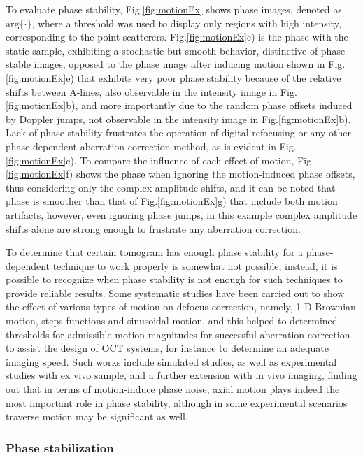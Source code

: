 To evaluate phase stability, Fig.\ref{fig:motionEx} shows phase images, denoted as $\text{arg}\{\cdot\}$, where a threshold was used to display only regions with high intensity, corresponding to the point scatterers. Fig.\ref{fig:motionEx}e) is the phase with the static sample, exhibiting a stochastic but smooth behavior, distinctive of phase stable images, opposed to the phase image after inducing motion shown in Fig.\ref{fig:motionEx}e) that exhibits very poor phase stability because of the relative shifts between A-lines, also observable in the intensity image in Fig.\ref{fig:motionEx}b), and more importantly due to the random phase offsets induced by Doppler jumps, not observable in the intensity image in Fig.\ref{fig:motionEx}b). Lack of phase stability frustrates the operation of digital refocusing or any other phase-dependent aberration correction method, as is evident in Fig.\ref{fig:motionEx}c). To compare the influence of each effect of motion, Fig.\ref{fig:motionEx}f) shows the phase when ignoring the motion-induced phase offsets, thus considering only the complex amplitude shifts, and it can be noted that phase is smoother than that of Fig.\ref{fig:motionEx}g) that include both motion artifacts, however, even ignoring phase jumps, in this example complex amplitude shifts alone are strong enough to frustrate any aberration correction.

To determine that certain tomogram has enough phase stability for a phase-dependent technique to work properly is somewhat not possible, instead, it is possible to recognize when phase stability is not enough for such techniques to provide reliable results. Some systematic studies have been carried out to show the effect of various types of motion on defocus correction, namely, 1-D Brownian motion, steps functions and sinusoidal motion, and this helped to determined thresholds for admissible motion magnitudes for successful aberration correction~\cite{Shemonski} to assist the design of OCT systems, for instance to determine an adequate imaging speed. Such works include simulated studies, as well as experimental studies with ex vivo sample, and a further extension with in vivo imaging, finding out that in terms of motion-induce phase noise, axial motion plays indeed the most important role in phase stability, although in some experimental scenarios traverse motion may be significant as well.

\subsubsection{Phase stabilization}

